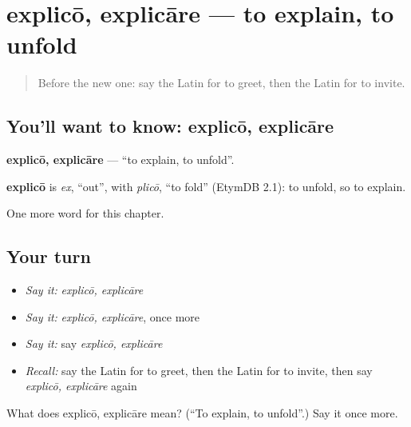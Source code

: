 \section[explicō, explicāre]{explicō, explicāre — to explain, to unfold}

\label{lesson:LA-C197-explico}



\begin{quote}
Before the new one: say the Latin for to greet, then the Latin for to invite.
\end{quote}

\subsection*{You'll want to know: explicō, explicāre}
\textbf{explicō, explicāre} — \textquotedblleft{}to explain, to unfold\textquotedblright{}.

\begin{cousinweb}
\textbf{explicō} is \emph{ex}, \textquotedblleft{}out\textquotedblright{}, with \emph{plicō}, \textquotedblleft{}to fold\textquotedblright{} (EtymDB 2.1): to unfold, so to explain.
\end{cousinweb}

\begin{grammarlens}[title={What you've built}]
One more word for this chapter.
\end{grammarlens}

\subsection*{Your turn}
\begin{itemize}
\raggedright
  \item \emph{Say it:} \emph{explicō, explicāre}
  \item \emph{Say it:} \emph{explicō, explicāre}, once more
  \item \emph{Say it:} say \emph{explicō, explicāre}
  \item \emph{Recall:} say the Latin for to greet, then the Latin for to invite, then say \emph{explicō, explicāre} again
\end{itemize}

\begin{tcolorbox}[breakable,colback=teal!4,colframe=teal!35!black,title={Before you move on}]
What does explicō, explicāre mean? (\textquotedblleft{}To explain, to unfold\textquotedblright{}.) Say it once more.
\end{tcolorbox}
